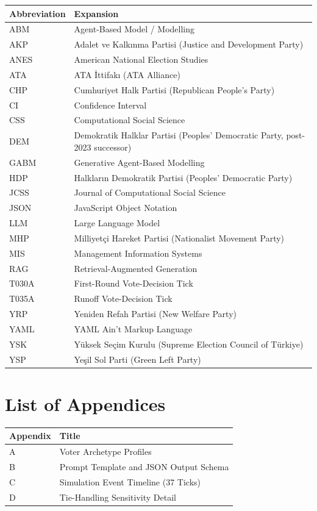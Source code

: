 \documentclass[12pt,a4paper]{report}
\begin{document}
\begin{tabularx}{\linewidth}{@{}lX@{}}
\toprule
\textbf{Abbreviation} & \textbf{Expansion} \\
\midrule
ABM & Agent-Based Model / Modelling \\
AKP & Adalet ve Kalkınma Partisi (Justice and Development Party) \\
ANES & American National Election Studies \\
ATA & ATA İttifakı (ATA Alliance) \\
CHP & Cumhuriyet Halk Partisi (Republican People's Party) \\
CI  & Confidence Interval \\
CSS & Computational Social Science \\
DEM & Demokratik Halklar Partisi (Peoples' Democratic Party, post-2023 successor) \\
GABM & Generative Agent-Based Modelling \\
HDP & Halkların Demokratik Partisi (Peoples' Democratic Party) \\
JCSS & Journal of Computational Social Science \\
JSON & JavaScript Object Notation \\
LLM & Large Language Model \\
MHP & Milliyetçi Hareket Partisi (Nationalist Movement Party) \\
MIS & Management Information Systems \\
RAG & Retrieval-Augmented Generation \\
T030A & First-Round Vote-Decision Tick \\
T035A & Runoff Vote-Decision Tick \\
YRP & Yeniden Refah Partisi (New Welfare Party) \\
YAML & YAML Ain't Markup Language \\
YSK & Yüksek Seçim Kurulu (Supreme Election Council of Türkiye) \\
YSP & Yeşil Sol Parti (Green Left Party) \\
\bottomrule
\end{tabularx}
\clearpage

\chapter*{List of Appendices}

\begin{tabularx}{\linewidth}{@{}lX@{}}
\toprule
\textbf{Appendix} & \textbf{Title} \\
\midrule
A & Voter Archetype Profiles \\
B & Prompt Template and JSON Output Schema \\
C & Simulation Event Timeline (37 Ticks) \\
D & Tie-Handling Sensitivity Detail \\
\bottomrule
\end{tabularx}
\clearpage
\end{document}
